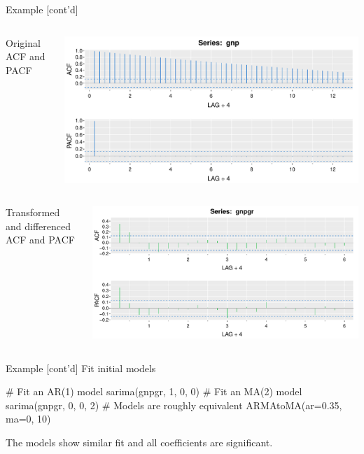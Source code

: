 \documentclass[ignorenonframetext,xcolor=x11names]{beamer}
\begin{document}
\begin{frame}{Example \small [cont'd]}
\begin{columns}
\begin{column}{0.15\textwidth}
\small
Original ACF and PACF
\end{column}
\begin{column}{0.75\textwidth}
\includegraphics[width=\textwidth]{figure22.pdf}
\end{column}
\end{columns}

\begin{columns}
\begin{column}{0.15\textwidth}
\small
Transformed and differenced ACF and PACF
\end{column}
\begin{column}{0.75\textwidth}
\includegraphics[width=\textwidth]{figure23.pdf}
\end{column}
\end{columns}
\end{frame}

\begin{frame}[fragile]{Example \small [cont'd]}
Fit initial models
\begin{Rcode}
# Fit an AR(1) model
sarima(gnpgr, 1, 0, 0)
# Fit an MA(2) model
sarima(gnpgr, 0, 0, 2)
# Models are roughly equivalent
ARMAtoMA(ar=0.35, ma=0, 10)
\end{Rcode}
The models show similar fit and all coefficients are significant.
\end{frame}
\end{document}

